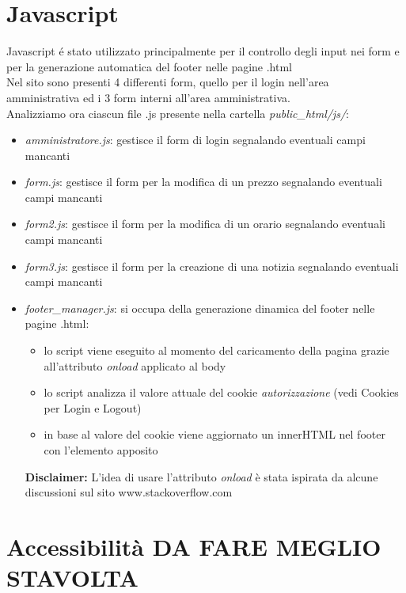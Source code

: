 \documentclass[12pt]{article}
\begin{document}
			\section{Javascript}
				 Javascript \'e stato utilizzato principalmente per il controllo degli input nei form e per la generazione automatica del footer nelle pagine .html\\
				 Nel sito sono presenti 4 differenti form, quello per il login nell'area amministrativa ed i 3 form interni all'area amministrativa. \\
				 Analizziamo ora ciascun file .js presente nella cartella \textit{public\_html/js/}:
				 \begin{itemize}
				 \item \textit{amministratore.js}: gestisce il form di login segnalando eventuali campi mancanti
				 \item \textit{form.js}: gestisce il form per la modifica di un prezzo segnalando eventuali campi mancanti
				 \item \textit{form2.js}: gestisce il form per la modifica di un orario segnalando eventuali campi mancanti
				 \item \textit{form3.js}: gestisce il form per la creazione di una notizia segnalando eventuali campi mancanti
				 \item \textit{footer\_manager.js}: si occupa della generazione dinamica del footer nelle pagine .html:
				 \begin{itemize}
				 \item lo script viene eseguito al momento del caricamento della pagina grazie all'attributo \textit{onload} applicato al body
				 \item lo script analizza il valore attuale del cookie \textit{autorizzazione} (vedi Cookies per Login e Logout)
				 \item in base al valore del cookie viene aggiornato un innerHTML nel footer con l'elemento apposito
				 \end{itemize}
				 \textbf{Disclaimer:} L'idea di usare l'attributo \textit{onload} \`e stata ispirata da alcune discussioni sul sito www.stackoverflow.com
				 \end{itemize}
				
	\newpage
		\section{Accessibilit\`a DA FARE MEGLIO STAVOLTA}
\end{document}
